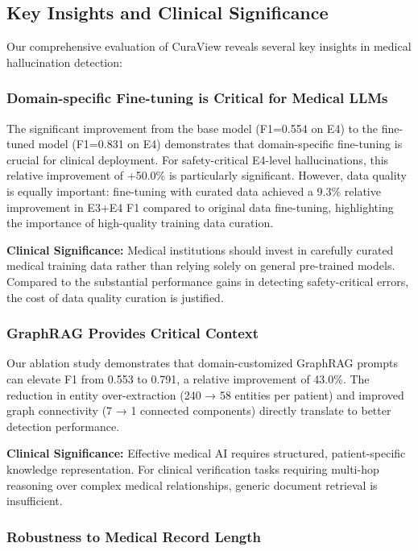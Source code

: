 \documentclass[11pt]{article}
\begin{document}
\subsection{Key Insights and Clinical Significance}

Our comprehensive evaluation of CuraView reveals several key insights in medical hallucination detection:

\subsubsection{Domain-specific Fine-tuning is Critical for Medical LLMs}

The significant improvement from the base model (F1=0.554 on E4) to the fine-tuned model (F1=0.831 on E4) demonstrates that domain-specific fine-tuning is crucial for clinical deployment. For safety-critical E4-level hallucinations, this relative improvement of +50.0\% is particularly significant. However, data quality is equally important: fine-tuning with curated data achieved a 9.3\% relative improvement in E3+E4 F1 compared to original data fine-tuning, highlighting the importance of high-quality training data curation.

\textbf{Clinical Significance:} Medical institutions should invest in carefully curated medical training data rather than relying solely on general pre-trained models. Compared to the substantial performance gains in detecting safety-critical errors, the cost of data quality curation is justified.

\subsubsection{GraphRAG Provides Critical Context}

Our ablation study demonstrates that domain-customized GraphRAG prompts can elevate F1 from 0.553 to 0.791, a relative improvement of 43.0\%. The reduction in entity over-extraction (240 → 58 entities per patient) and improved graph connectivity (7 → 1 connected components) directly translate to better detection performance.

\textbf{Clinical Significance:} Effective medical AI requires structured, patient-specific knowledge representation. For clinical verification tasks requiring multi-hop reasoning over complex medical relationships, generic document retrieval is insufficient.

\subsubsection{Robustness to Medical Record Length}
\end{document}
